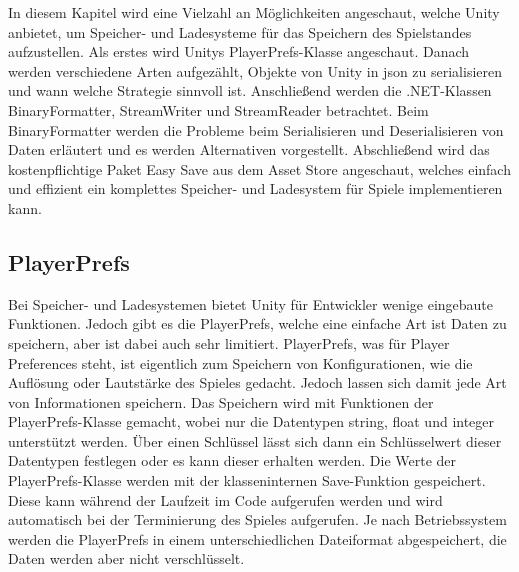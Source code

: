 In diesem Kapitel wird eine Vielzahl an Möglichkeiten angeschaut, welche Unity anbietet, um Speicher- und Ladesysteme für das Speichern des Spielstandes aufzustellen. Als erstes wird Unitys PlayerPrefs-Klasse angeschaut. Danach werden verschiedene Arten aufgezählt, Objekte von Unity in \ac{json} zu serialisieren und wann welche Strategie sinnvoll ist. Anschließend werden die .NET-Klassen BinaryFormatter, StreamWriter und StreamReader betrachtet. Beim BinaryFormatter werden die Probleme beim Serialisieren und Deserialisieren von Daten erläutert und es werden Alternativen vorgestellt. Abschließend wird das kostenpflichtige Paket Easy Save aus dem Asset Store angeschaut, welches einfach und effizient ein komplettes Speicher- und Ladesystem für Spiele implementieren kann.



\subsection{PlayerPrefs}
Bei Speicher- und Ladesystemen bietet Unity für Entwickler wenige eingebaute Funktionen. Jedoch gibt es die PlayerPrefs, welche eine einfache Art ist Daten zu speichern, aber ist dabei auch sehr limitiert. PlayerPrefs, was für Player Preferences steht, ist eigentlich zum Speichern von Konfigurationen, wie die Auflösung oder Lautstärke des Spieles gedacht. Jedoch lassen sich damit jede Art von Informationen speichern. Das Speichern wird mit Funktionen der PlayerPrefs-Klasse gemacht, wobei nur die Datentypen string, float und integer unterstützt werden. Über einen Schlüssel lässt sich dann ein Schlüsselwert dieser Datentypen festlegen oder es kann dieser erhalten werden. Die Werte der PlayerPrefs-Klasse werden mit der klasseninternen Save-Funktion gespeichert. Diese kann während der Laufzeit im Code aufgerufen werden und wird automatisch bei der Terminierung des Spieles aufgerufen.\cite{unityPlayerPrefsSave} Je nach Betriebssystem werden die PlayerPrefs in einem unterschiedlichen Dateiformat abgespeichert, die Daten werden aber nicht verschlüsselt.\cite{unityPlayerPrefs}

